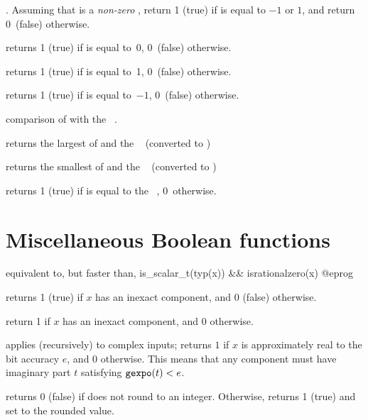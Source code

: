 . Assuming that  is a
\emph{non-zero} , return 1 (true) if  is equal to $-1$ or
$1$, and return 0~(false) otherwise.

 returns 1 (true) if  is equal to~0, 0~(false)
otherwise.

 returns 1 (true) if  is equal to~1, 0~(false)
otherwise.

 returns 1 (true) if  is equal to~$-1$,
0~(false) otherwise.



 comparison of  with the
~.


 returns the largest of  and
the ~ (converted to )


 returns the smallest of  and the
~ (converted to )


 returns 1 (true) if  is equal to
the ~, 0~otherwise.

\section{Miscellaneous Boolean functions}

 equivalent to, but faster than,
\bprog
  is_scalar_t(typ(x)) && isrationalzero(x)
@eprog

 returns 1 (true) if $x$ has an inexact
component, and 0 (false) otherwise.

 return 1 if $x$ has an inexact
 component, and 0  otherwise.

 applies (recursively) to complex inputs;
returns $1$ if $x$ is approximately real to the bit accuracy $e$, and 0
otherwise. This means that any  component must have imaginary part
$t$ satisfying ${\tt gexpo}(t) < e$.

 returns 0 (false) if  does not round
to an integer. Otherwise, returns 1 (true) and set  to the rounded
value.

